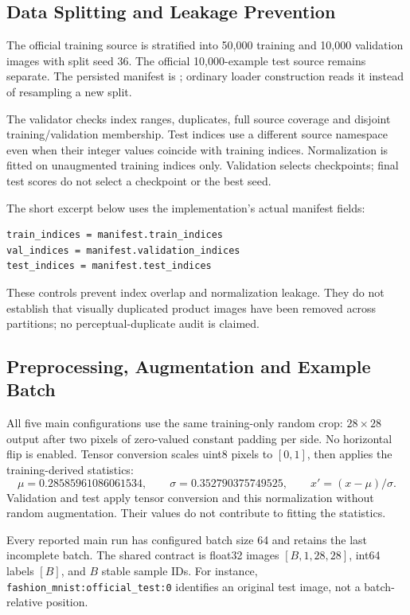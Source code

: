 \documentclass[oneside,final,a4paper]{hcmut-report}
\begin{document}
\subsection{Data Splitting and Leakage Prevention}
The official training source is stratified into 50,000 training and 10,000 validation
images with split seed 36. The official 10,000-example test source remains separate.
The persisted manifest is ;
ordinary loader construction reads it instead of resampling a new split.

The validator checks index ranges, duplicates, full source coverage and disjoint
training/validation membership. Test indices use a different source namespace even
when their integer values coincide with training indices. Normalization is fitted
on unaugmented training indices only. Validation selects checkpoints; final test
scores do not select a checkpoint or the best seed.

The short excerpt below uses the implementation's actual manifest fields:
\begin{lstlisting}[style=pythoncode]
train_indices = manifest.train_indices
val_indices = manifest.validation_indices
test_indices = manifest.test_indices
\end{lstlisting}
These controls prevent index overlap and normalization leakage. They do not establish
that visually duplicated product images have been removed across partitions;
no perceptual-duplicate audit is claimed.

\subsection{Preprocessing, Augmentation and Example Batch}
\label{sec:preprocess}
All five main configurations use the same training-only random crop:
\(28\times28\) output after two pixels of zero-valued constant padding per side.
No horizontal flip is enabled. Tensor conversion scales uint8 pixels to \([0,1]\),
then applies the training-derived statistics:
\[
 \mu=0.28585961086061534,\qquad
 \sigma=0.352790375749525,\qquad x'=(x-\mu)/\sigma.
\]
Validation and test apply tensor conversion and this normalization without random
augmentation. Their values do not contribute to fitting the statistics.

Every reported main run has configured batch size 64 and retains the last incomplete
batch. The shared contract is float32 images \([B,1,28,28]\), int64 labels \([B]\),
and \(B\) stable sample IDs. For instance,
\texttt{fashion\_mnist:official\_test:0} identifies an original test image, not a
batch-relative position.
\end{document}
